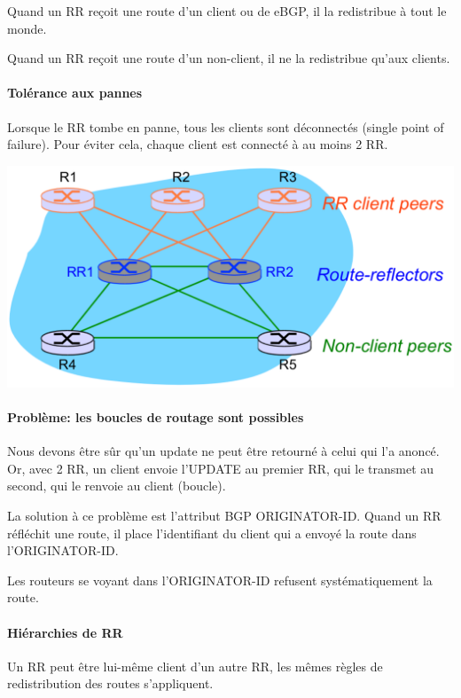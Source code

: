 \documentclass{article}
\begin{document}
\begin{sffamily}
Quand un RR reçoit une route d'un client ou de eBGP, il la redistribue
à tout le monde.

Quand un RR reçoit une route d'un non-client, il ne la redistribue
qu'aux clients.

\paragraph{Tolérance aux pannes}

Lorsque le RR tombe en panne, tous les clients sont déconnectés
(single point of failure). Pour éviter cela, chaque client est
connecté à au moins 2 RR.

\includegraphics[width=\textwidth]{fab_009.pdf}

\paragraph{Problème: les boucles de routage sont possibles}

Nous devons être sûr qu'un update ne peut être retourné à celui qui
l'a anoncé. Or, avec 2 RR, un client envoie l'UPDATE au premier RR,
qui le transmet au second, qui le renvoie au client (boucle).

La solution à ce problème est l'attribut BGP ORIGINATOR-ID. Quand un
RR réfléchit une route, il place l'identifiant du client qui a
envoyé la route dans l'ORIGINATOR-ID.

Les routeurs se voyant dans l'ORIGINATOR-ID refusent systématiquement
la route.

\paragraph{Hiérarchies de RR}

Un RR peut être lui-même client d'un autre RR, les mêmes règles de
redistribution des routes s'appliquent.


\end{sffamily}
\end{document}
